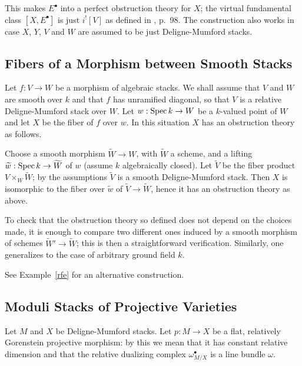 \documentclass[11pt]{article}
\theoremstyle{plain}
\theoremstyle{definition}
\renewcommand{\tilde}{\widetilde}
\newcommand{\upsh}{^{!}}
\newcommand{\com}{^{\scriptscriptstyle\bullet}}
\newcommand{\spec}{\mathop{\rm Spec}\nolimits}
\theoremstyle{plain}
\theoremstyle{definition}
\theoremstyle{remark}
\begin{document}
This makes \(E\com\) into a perfect obstruction theory for \(X\); the
virtual fundamental class \([X,E\com]\) is just \(i\upsh[V]\) as defined
in \cite{fulton}, p.~98. The construction also works in case \(X\), \(Y\),
\(V\) and \(W\) are assumed to be just Deligne-Mumford stacks.

\subsection{Fibers of a Morphism between Smooth Stacks}

Let \(f:V\rightarrow W\) be a morphism of algebraic stacks. We shall
assume that \(V\) and \(W\) are smooth over \(k\) and that \(f\) has
unramified diagonal, so that \(V\) is a relative Deligne-Mumford stack
over \(W\). Let \(w:\spec k\rightarrow W\) be a \(k\)-valued point of \(W\)
and let \(X\) be the fiber of \(f\) over \(w\). In this situation \(X\) has an
obstruction theory as follows.

Choose a smooth morphism \(\tilde W\to W\), with \(\tilde W\) a scheme,
and a lifting \(\tilde w:\spec k\to \tilde W\) of \(w\) (assume \(k\)
algebraically closed). Let \(\tilde V\) be the fiber product
\(V\times_W\tilde W\); by the assumptions \(\tilde V\) is a smooth
Deligne-Mumford stack. Then \(X\) is isomorphic to the fiber over
\(\tilde w\) of \(\tilde V\to \tilde W\), hence it has an obstruction
theory as above.

To check that the obstruction theory so defined does not depend on the
choices made, it is enough to compare two different ones induced by a
smooth morphism of schemes \(\tilde W'\to \tilde W\); this is then a
straightforward verification. Similarly, one generalizes to the case
of arbitrary ground field \(k\).

See Example~\ref{rfe} for an alternative construction.




\newcommand{\reldu}{\omega}
\newcommand{\eext}{\mathop{{\rm Ext}}\nolimits}

\subsection{Moduli Stacks of Projective Varieties}


Let \(M\) and \(X\) be Deligne-Mumford stacks.  Let \(p:M\to X\) be a flat,
relatively
Gorenstein projective morphism: by this we mean that it has constant relative
dimension and that the relative dualizing complex \(\omega\com_{M/X}\) is a line
bundle
\(\omega\).
\end{document}
